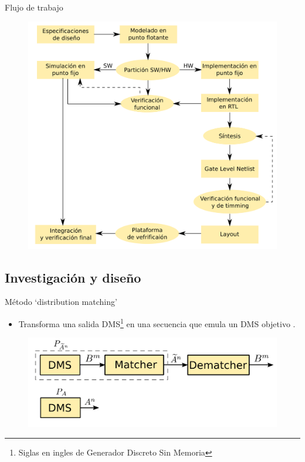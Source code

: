 \documentclass[xcolor=table]{beamer}
\begin{document}
\begin{frame}{Flujo de trabajo}

\begin{figure}[H]
\includegraphics[width=0.65\paperwidth]{Diagramas/diag_flujo.png}
\end{figure}
\end{frame}

\subsection{Investigación y diseño}

\begin{frame}{Método `distribution matching' }
\begin{itemize}
    \item Transforma una salida DMS\footnote{Siglas en ingles de Generador Discreto Sin Memoria} en una secuencia que emula un DMS objetivo \cite{baur}.
\end{itemize}
\begin{figure}[H]
\includegraphics[width=0.70\paperwidth]{Diagramas/matcher.png}
\end{figure}
\end{frame}
\end{document}
